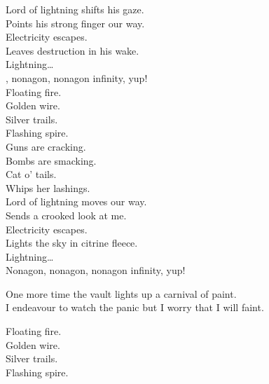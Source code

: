 



Lord of lightning shifts his gaze. \\
Points his strong finger our way. \\
Electricity escapes. \\
Leaves destruction in his wake. \\

Lightning… \\

, nonagon, nonagon infinity, yup! \\

Floating fire. \\
Golden wire. \\
Silver trails. \\
Flashing spire. \\

Guns are cracking. \\
Bombs are smacking. \\
Cat o' tails. \\
Whips her lashings. \\

Lord of lightning moves our way. \\
Sends a crooked look at me. \\
Electricity escapes. \\
Lights the sky in citrine fleece. \\

Lightning… \\

Nonagon, nonagon, nonagon infinity, yup! \\


One more time the vault lights up a carnival of paint. \\
I endeavour to watch the panic but I worry that I will faint. \\


Floating fire. \\
Golden wire. \\
Silver trails. \\
Flashing spire. \\

